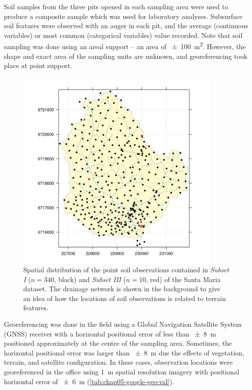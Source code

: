 Soil samples from the three pits opened in each sampling area were used to produce a composite sample which 
was 
used for laboratory analyses. Subsurface soil features were observed with an auger in each pit, and the 
average 
(continuous variables) or most common (categorical variables) value recorded. Note that soil sampling was done 
using an areal support -- an area of \SI{\pm100}{\metre\squared}. However, the shape and exact area of the 
sampling units are unknown, and georeferencing took place at point support.

\begin{figure}[!ht]
\centering
\includegraphics[width=0.90\textwidth]{fig/chap04-subsets-I-III}
\caption[Spatial distribution of \emph{Subset I} and \emph{Subset III}.]{Spatial distribution of the point soil 
observations contained in \emph{Subset I} ($n = 340$, black) and \emph{Subset III} ($n = 10$, red) of the Santa 
Maria dataset. The drainage network is shown in the background to give an idea of how the locations of soil 
observations is related to terrain features.}
\label{fig:chap04-subsets-I-III}
\end{figure}

Georeferencing was done in the field using a Global Navigation Satellite System (GNSS) receiver with a 
horizontal positional error of less than \SI{\pm8}{\metre} positioned approximately at the centre of the
sampling area. Sometimes, the horizontal positional error was larger than \SI{\pm8}{\metre} due the effects
of vegetation, terrain, and satellite configuration. In these cases, observation locations 
were georeferenced in the office using \SI{1}{\metre} spatial resolution \googleearth{} imagery with 
positional 
horizontal error of \SI{\pm6}{\metre} (\autoref{tab:chap05-google-geo-val}).

